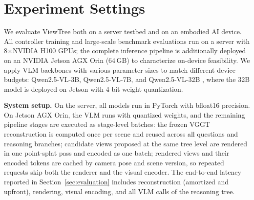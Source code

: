
\section{Experiment Settings}
\label{sec:experiment_setting}

We evaluate ViewTree both on a server testbed and on an embodied AI device. All controller training and large-scale benchmark evaluations run on a server with 8$\times$NVIDIA H100 GPUs; the complete inference pipeline is additionally deployed on an NVIDIA Jetson AGX Orin (64\,GB) to characterize on-device feasibility. We apply VLM backbones with various parameter sizes to match different device budgets: Qwen2.5-VL-3B, Qwen2.5-VL-7B, and Qwen2.5-VL-32B \cite{bai2025qwen2}, where the 32B model is deployed on Jetson with 4-bit weight quantization.

\noindent\textbf{System setup.} On the server, all models run in PyTorch with bfloat16 precision. On Jetson AGX Orin, the VLM runs with quantized weights, and the remaining pipeline stages are executed as stage-level batches: the frozen VGGT \cite{wang2025vggt} reconstruction is computed once per scene and reused across all questions and reasoning branches; candidate views proposed at the same tree level are rendered in one point-splat pass and encoded as one batch; rendered views and their encoded tokens are cached by camera pose and scene version, so repeated requests skip both the renderer and the visual encoder. The end-to-end latency reported in Section~\ref{sec:evaluation} includes reconstruction (amortized and upfront), rendering, visual encoding, and all VLM calls of the reasoning tree.

